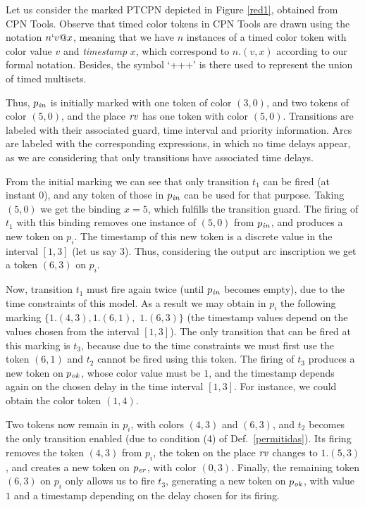 \begin{example} Let us consider the marked PTCPN depicted in Figure \ref{red1}, 
obtained from CPN Tools. 
% 
Observe that timed color tokens in CPN Tools are drawn
using the notation $n`v@x$,
meaning that we have $n$ instances of a timed color token 
with color value $v$ and {\em timestamp} $x$, which correspond to $n.(v,x)$
according to our formal notation. Besides, the symbol `+++'
is there used to represent the union of timed
multisets. 

Thus, $p_{\it in}$ is initially marked with one token
of color $(3,0)$, and two tokens of color $(5,0)$,
and the place ${\it rv}$ has one token with color
$(5,0)$.  Transitions are labeled
with their associated guard, time interval and priority
information. 
Arcs are labeled with the corresponding expressions,
in which no time delays appear, as we are considering
that only transitions have associated time delays.

From the initial marking we can see that
only transition $t_1$ can be fired (at instant $0$), and
any token of those in $p_{\it in}$ can be used for
that purpose.  Taking $(5,0)$ we get the binding $x=5$,
which fulfills the transition guard.
The firing of $t_1$ with this binding removes
one instance of $(5,0)$ from $p_{\it in}$,
and produces a new token on $p_i$.
The timestamp of this new token is a discrete value
in the interval $[1,3]$ (let us say $3$).
Thus, considering the output
arc inscription we get a token $(6,3)$  on $p_i$.

Now, transition $t_1$ must fire again twice (until $p_{\it in}$ 
becomes empty), due to the time constraints of this model. 
As a result we may obtain in $p_i$ the following marking
$\{1.(4,3), 1.(6,1),$
$ 1.(6,3)\}$ (the timestamp values depend on the values
chosen from the interval $[1,3]$).
% 
The only transition that can be fired at this marking
is $t_3$, because due to the time constraints 
we must first use the token $(6,1)$
and $t_2$ cannot be fired using this token.
The firing of $t_3$ produces a new token on $p_{\it ok}$,
whose color value must be $1$, and the timestamp
depends again on the chosen delay in the time interval
$[1,3]$. For instance, we could obtain the 
color token $(1,4)$. 

Two tokens now remain in $p_i$, with colors  $(4,3)$ and 
$(6,3)$, and $t_2$ becomes the only transition
enabled (due to condition (4) of Def.\ \ref{permitidas}).
Its firing removes the token $(4,3)$ from $p_i$,
the token on the place ${\it rv}$ changes to $1.(5,3)$,  
and creates a new token on $p_{\it er}$, with color $(0,3)$. 
%
% 
Finally, the remaining token $(6,3)$ on $p_i$ 
only allows us to fire $t_3$, generating a new token
on $p_{\it ok}$, with value $1$ and a timestamp
depending on the delay chosen for its firing.
\end{example}



